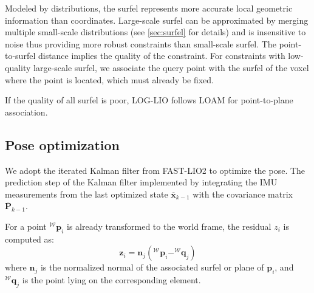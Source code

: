 \documentclass[letterpaper, 10 pt, conference]{ieeeconf}  %
\begin{document}
Modeled by distributions, the surfel represents more accurate local geometric information than coordinates.
Large-scale surfel can be approximated by merging multiple small-scale distributions (see \ref{sec:surfel} for details) and is insensitive to noise thus providing more robust constraints than small-scale surfel.
The point-to-surfel distance implies the quality of the constraint.
For constraints with low-quality large-scale surfel, we associate the query point with the surfel of the voxel where the point is located, which must already be fixed.


If the quality of all surfel is poor, LOG-LIO follows LOAM for point-to-plane association.

\subsection{Pose optimization}
\label{sec:pose_optimization}

We adopt the iterated Kalman filter from FAST-LIO2 to optimize the pose.
The prediction step of the Kalman filter implemented by integrating the IMU measurements from the last optimized state $\overline{\mathbf{x}}_{k-1}$ with the covariance matrix $\overline{\mathbf{P}}_{k-1}$.

For a point $^\mathcal{W}\boldsymbol{p}_i$ is already transformed to the world frame, the residual $z_i$ is computed as:
\begin{equation}
        \mathbf{z}_i = \boldsymbol{n}_j(^\mathcal{W}\boldsymbol{p}_i - ^\mathcal{W}\boldsymbol{q}_j)
        \label{eq_z_i}
\end{equation}
where $\boldsymbol{n}_j$ is the normalized normal of the associated surfel or plane of $\boldsymbol{p}_i$, and $^\mathcal{W}\boldsymbol{q}_j$ is the point lying on the corresponding element.
\end{document}

